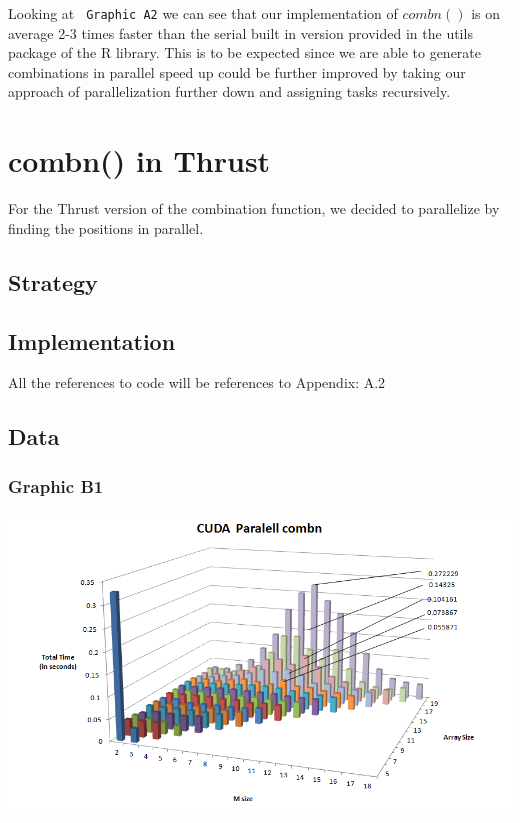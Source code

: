 \documentclass[titlepage, 11pt]{article}
\begin{document}
Looking at \verb; Graphic A2; we can see that our implementation of $combn()$ is on average 2-3 times faster than the serial built in version provided in the utils package of the R library. This is to be expected since we are able to generate combinations in parallel speed up could be further improved by taking our approach of parallelization further down and assigning tasks recursively.

\section{combn() in Thrust}
For the Thrust version of the combination function, we decided to parallelize by finding the positions in parallel.

\subsection{Strategy}

\subsection{Implementation}
\begin{center}\textcolor{black!50}{All the references to code will be references to Appendix: A.2}\\ \end{center}


\subsection{Data}
\subsubsection{Graphic B1}
\includegraphics[scale = 0.5]{images/3D-Thrust.png} \\
\end{document}
